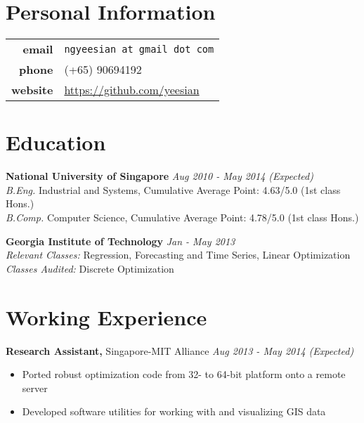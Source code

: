 \documentclass[margin]{res}
\begin{document}
 
\begin{resume}
 

\section{Personal Information}
\begin{tabular}{r l}
{\bf email} & \texttt{ngyeesian at gmail dot com} \\
{\bf phone} & (+65) 90694192 \\
{\bf website} & \url{https://github.com/yeesian} \\
\end{tabular}

\section{Education} 
{\bf National University of Singapore}  \hfill \textit{Aug 2010 - May 2014 (Expected)} \\
\textit{B.Eng.} Industrial and Systems, Cumulative Average Point: 4.63/5.0 (1st class Hons.) \\
\textit{B.Comp.} Computer Science, Cumulative Average Point: 4.78/5.0 (1st class Hons.)

{\bf Georgia Institute of Technology}  \hfill \textit{Jan - May 2013}\\
\textit{Relevant Classes:} Regression, Forecasting and Time Series, Linear Optimization \\
\textit{Classes Audited:} Discrete Optimization

\section{Working Experience}
{\bf Research Assistant,} Singapore-MIT Alliance \hfill \textit{Aug 2013 - May 2014 (Expected)}
\begin{itemize} \itemsep -2pt  %
\item Ported robust optimization code from 32- to 64-bit platform onto a remote server
\item Developed software utilities for working with and visualizing GIS data
\end{itemize}
 

\end{resume}
\end{document}
